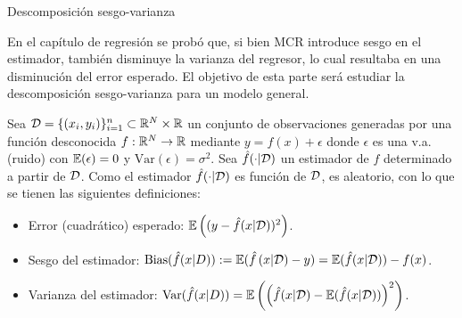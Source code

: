 \documentclass[9pt, handout]{beamer}
\begin{document}
\begin{frame}{Descomposición sesgo-varianza}

En el capítulo de regresión se probó que, si bien MCR introduce sesgo en el estimador, también disminuye la varianza del regresor, lo cual resultaba en una disminución del error esperado. El objetivo de esta parte será estudiar la descomposición sesgo-varianza para un modelo general.\pause

\begin{definition}
	Sea ${\mathcal D}=\{(x_i,y_i)\}_{i=1}^n\subset\mathbb{R}^N\times\mathbb{R}$ un conjunto de observaciones generadas por una función desconocida $f:\mathbb{R}^N\to\mathbb{R}$ mediante $y=f(x)+\epsilon$ donde $\epsilon$ es una v.a. (ruido) con $\operatorname{\mathbb{E}}(\epsilon)=0$ y $\text{Var}(\epsilon)=\sigma^2$. Sea $\hat{f}(\cdot|{\mathcal D})$ un estimador de $f$ determinado a partir de ${\mathcal D}$. Como el estimador $\hat{f}(\cdot|{\mathcal D})$ es función de ${\mathcal D}$, es aleatorio, con lo que se tienen las siguientes definiciones:
	
	\begin{itemize}
		\item Error (cuadrático) esperado: $\operatorname{\mathbb{E}}\left((y-\hat{f}(x|{\mathcal D}))^2\right)$.\pause
		\item Sesgo del estimador: $\text{Bias}(\hat{f}(x|D)):=\operatorname{\mathbb{E}}(\hat{f}\left(x|{\mathcal D}) - y\right) = \operatorname{\mathbb{E}}(\hat{f}(x|{\mathcal D})) - f(x)$.\pause
		\item Varianza del estimador: $\text{Var}(\hat{f}(x|D)) = \operatorname{\mathbb{E}}\left(\left(\hat{f}(x|{\mathcal D})-\operatorname{\mathbb{E}}(\hat{f}(x|{\mathcal D}))\right)^2\right)$.
		
	\end{itemize}
\end{definition}
	
\end{frame}
\end{document}
